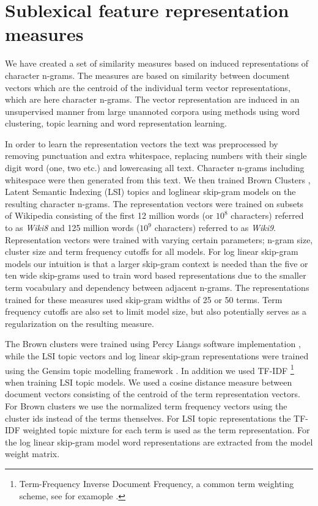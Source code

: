\section{Sublexical feature representation measures}
\label{subrep-features}

We have created a set of similarity measures based on induced representations of character n-grams. The measures are based on similarity between document vectors which are the centroid of the individual term vector representations, which are here character n-grams. The vector representation are induced in an unsupervised manner from large unannoted corpora using methods using word clustering, topic learning and word representation learning.

In order to learn the representation vectors the text was preprocessed by removing punctuation and extra whitespace, replacing numbers with their single digit word (one, two etc.) and lowercasing all text. Character n-grams including whitespace were then generated from this text. We then trained Brown Clusters \cite{brown1992class}, Latent Semantic Indexing (LSI) topics \cite{deerwester1990indexing} and loglinear skip-gram models \cite{mikolov2013efficient} on the resulting character n-grams. The representation vectors were trained on subsets of Wikipedia consisting of the first 12 million words (or $10^8$ characters) referred to as {\it Wiki8} and 125 million words ($10^9$ characters) referred to as {\it Wiki9}. Representation vectors were trained with varying certain parameters;  n-gram size, cluster size and term frequency cutoffs for all models.
For log linear skip-gram models our intuition is that a larger skip-gram context is needed than the five or ten wide skip-grams used to train word based representations due to the smaller term vocabulary and dependency between adjacent n-grams. The representations trained for these measures used skip-gram widths of 25 or 50 terms. Term frequency cutoffs are also set to limit model size, but also potentially serves as a regularization on the resulting measure.

The Brown clusters were trained using Percy Liangs software implementation \cite{liang2005semi}, while the LSI topic vectors and log linear skip-gram representations were trained using the Gensim topic modelling framework \cite{gensim_lrec}. In addition we used TF-IDF \footnote{Term-Frequency Inverse Document Frequency, a common term weighting scheme, see for examople \cite{manning2008introduction}.} when training LSI topic models. We used a cosine distance measure between document vectors consisting of the centroid of the term representation vectors. For Brown clusters we use the normalized term frequency vectors using the cluster ids instead of the terms thenselves. For LSI topic representations the TF-IDF weighted topic mixture for each term is used as the term representation. For the log linear skip-gram model word representations are extracted from the model weight matrix.


